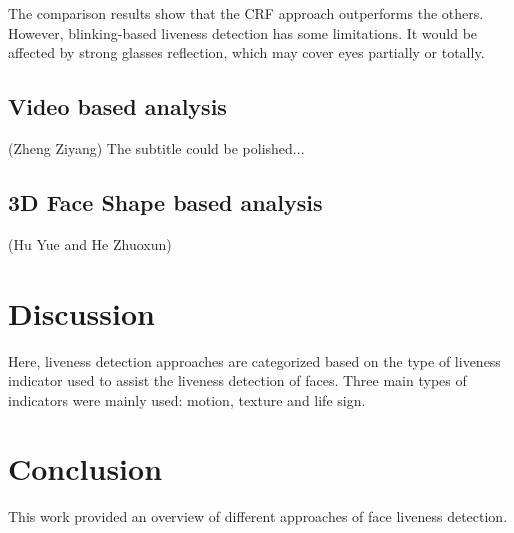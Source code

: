 \documentclass[journal]{IEEEtran}
\begin{document}
The comparison results show that the CRF approach outperforms the others. However, blinking-based liveness detection has some limitations. It would be affected by strong glasses reflection, which may cover eyes partially or totally.

\subsection{Video based analysis}

(Zheng Ziyang) The subtitle could be polished...

\subsection{3D Face Shape based analysis}

(Hu Yue and He Zhuoxun)




\section{Discussion}

Here, liveness detection approaches are categorized based on the type of liveness indicator used to assist the liveness detection of faces. Three main types of indicators were mainly used: motion, texture and life sign.



\section{Conclusion}

This work provided an overview of different approaches of face liveness detection. 






%
\end{document}
